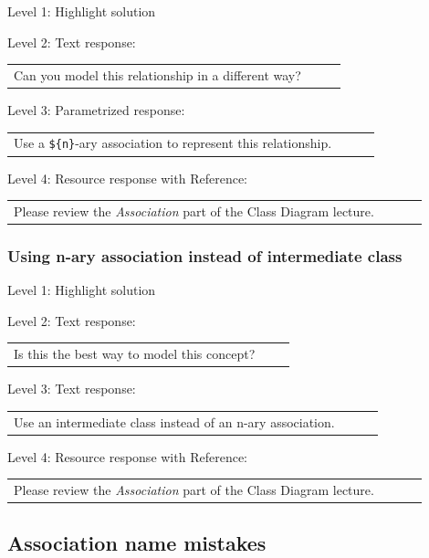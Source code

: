 \noindent Level 1: Highlight solution  \medskip

\noindent Level 2: Text response: \medskip

\begin{tabular}{|p{0.9\linewidth}}
Can you model this relationship in a different way?
\end{tabular} \medskip

\noindent Level 3: Parametrized response: \medskip

\begin{tabular}{|p{0.9\linewidth}}
Use a \verb|${n}|-ary association to represent this relationship.
\end{tabular} \medskip

\noindent Level 4: Resource response with Reference: \medskip

\begin{tabular}{|p{0.9\linewidth}}
Please review the \textit{Association} part of the Class Diagram lecture.
\end{tabular} \medskip


\subsubsection{Using n-ary association instead of intermediate class}

\noindent Level 1: Highlight solution  \medskip

\noindent Level 2: Text response: \medskip

\begin{tabular}{|p{0.9\linewidth}}
Is this the best way to model this concept?
\end{tabular} \medskip

\noindent Level 3: Text response: \medskip

\begin{tabular}{|p{0.9\linewidth}}
Use an intermediate class instead of an n-ary association.
\end{tabular} \medskip

\noindent Level 4: Resource response with Reference: \medskip

\begin{tabular}{|p{0.9\linewidth}}
Please review the \textit{Association} part of the Class Diagram lecture.
\end{tabular} \medskip


\subsection{Association name mistakes}

